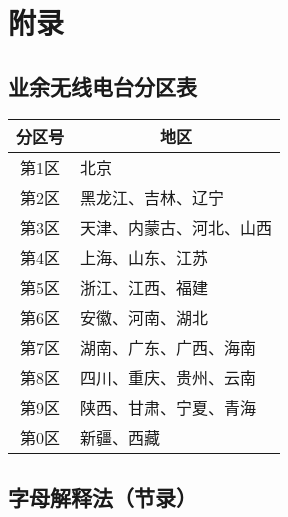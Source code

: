 \chapter{附录}

\section{业余无线电台分区表}

\begin{center}
  \begin{tabular}[t]{|c|l|}
    \hline
    \multicolumn{1}{|c|}{\textbf{分区号}} & \multicolumn{1}{|c|}{\textbf{地区}} \\
    \hline
    第1区                                & 北京                                \\
    \hline
    第2区                                & 黑龙江、吉林、辽宁                         \\
    \hline
    第3区                                & 天津、内蒙古、河北、山西                      \\
    \hline
    第4区                                & 上海、山东、江苏                          \\
    \hline
    第5区                                & 浙江、江西、福建                          \\
    \hline
    第6区                                & 安徽、河南、湖北                          \\
    \hline
    第7区                                & 湖南、广东、广西、海南                       \\
    \hline
    第8区                                & 四川、重庆、贵州、云南                       \\
    \hline
    第9区                                & 陕西、甘肃、宁夏、青海                       \\
    \hline
    第0区                                & 新疆、西藏                             \\
    \hline
  \end{tabular}
\end{center}

\newpage

\section{字母解释法（节录）}

